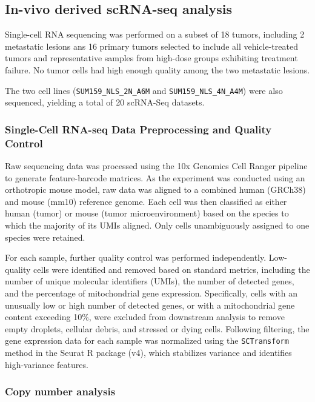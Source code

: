 \documentclass[11pt,notitlepage]{article}
\begin{document}
\subsection{In-vivo derived scRNA-seq analysis}

Single-cell RNA sequencing was performed on a subset of 18 tumors, including 2 metastatic lesions ans 16 primary tumors selected to include all vehicle-treated tumors and representative samples from high-dose groups exhibiting treatment failure. No tumor cells had high enough quality among the two metastatic lesions.

The two cell lines (\texttt{SUM159\_NLS\_2N\_A6M} and \texttt{SUM159\_NLS\_4N\_A4M}) were also sequenced, yielding a total of 20 scRNA-Seq datasets.


\subsubsection{Single-Cell RNA-seq Data Preprocessing and Quality Control}
Raw sequencing data was processed using the 10x Genomics Cell Ranger pipeline to generate feature-barcode matrices. As the experiment was conducted using an orthotropic mouse model, raw data was aligned to a combined human (GRCh38) and mouse (mm10) reference genome. Each cell was then classified as either human (tumor) or mouse (tumor microenvironment) based on the species to which the majority of its UMIs aligned. Only cells unambiguously assigned to one species were retained. 

For each sample, further quality control was performed independently. Low-quality cells were identified and removed based on standard metrics, including the number of unique molecular identifiers (UMIs), the number of detected genes, and the percentage of mitochondrial gene expression. Specifically, cells with an unusually low or high number of detected genes, or with a mitochondrial gene content exceeding 10\%, were excluded from downstream analysis to remove empty droplets, cellular debris, and stressed or dying cells. Following filtering, the gene expression data for each sample was normalized using the \texttt{SCTransform} method in the Seurat R package (v4), which stabilizes variance and identifies high-variance features.

\subsubsection{Copy number analysis}
\end{document}

